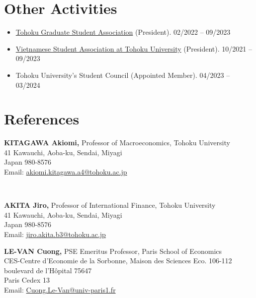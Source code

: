 \documentclass[margin,line]{res}
\begin{document}
\begin{resume}
\section{\sc Other Activities}
\begin{itemize}
\item[] \href{https://inseikaitohoku.org/}{Tohoku Graduate Student Association} (President).  \hfill 02/2022 -- 09/2023
\item[] \href{https://vsatohoku.wordpress.com/}{Vietnamese Student Association at Tohoku University} (President).  \hfill 10/2021 -- 09/2023
\item[] Tohoku University's Student Council (Appointed Member). \hfill 04/2023 -- 03/2024
\end{itemize}


\section{\sc References}
\vspace*{.05in}
\parbox{\textwidth}{
{\bf KITAGAWA Akiomi,} Professor of Macroeconomics, Tohoku University \\
41 Kawauchi, Aoba-ku, Sendai, Miyagi \\
Japan 980-8576 \\
Email: \href{mailto:akiomi.kitagawa.a4@tohoku.ac.jp}{akiomi.kitagawa.a4@tohoku.ac.jp}} \\

\par
\parbox{\textwidth}{
{\bf AKITA Jiro,} Professor of International Finance, Tohoku University\\
41 Kawauchi, Aoba-ku, Sendai, Miyagi \\
Japan 980-8576 \\
Email: \href{mailto:jiro.akita.b3@tohoku.ac.jp}{jiro.akita.b3@tohoku.ac.jp}}

\par
\parbox{\textwidth}{
{\bf LE-VAN Cuong,} PSE Emeritus Professor, Paris School of Economics\\
CES-Centre d'Economie de la Sorbonne, Maison des Sciences Eco. 106-112 boulevard de l'Hôpital 75647 \\
Paris Cedex 13 \\
Email: \href{mailto:Cuong.Le-Van@univ-paris1.fr}{Cuong.Le-Van@univ-paris1.fr}}


\end{resume}
\end{document}
